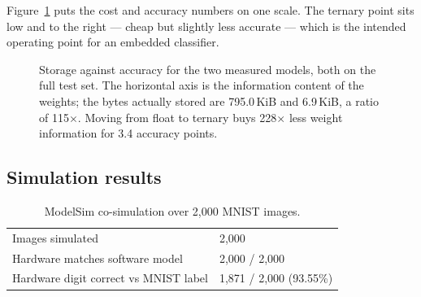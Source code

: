 \documentclass[11pt,a4paper]{article}
\newcommand{\good}{\textcolor{good}{\textbf{}}}
\begin{document}
Figure~\ref{fig:cost} puts the cost and accuracy numbers on one scale. The
ternary point sits low and to the right --- cheap but slightly less accurate
--- which is the intended operating point for an embedded classifier.

\begin{figure}[H]
\centering
{}
\caption{Storage against accuracy for the two measured models, both on the full
  test set. The horizontal axis is the information content of the weights; the
  bytes actually stored are 795.0\,KiB and 6.9\,KiB, a ratio of 115$\times$.
  Moving from float to ternary buys 228$\times$ less weight information for
  3.4 accuracy points.}
\label{fig:cost}
\end{figure}

\subsection{Simulation results}

\begin{table}[H]
\centering
\small
\caption{ModelSim co-simulation over 2{,}000 MNIST images.}
\label{tab:sim}
\begin{tabularx}{\linewidth}{@{}lY@{}}
\toprule
Images simulated                     & 2{,}000 \\
Hardware matches software model       & \good 2{,}000 / 2{,}000 \\
Hardware digit correct vs MNIST label & 1{,}871 / 2{,}000 (93.55\%) \\
\bottomrule
\end{tabularx}
\end{table}
\end{document}
